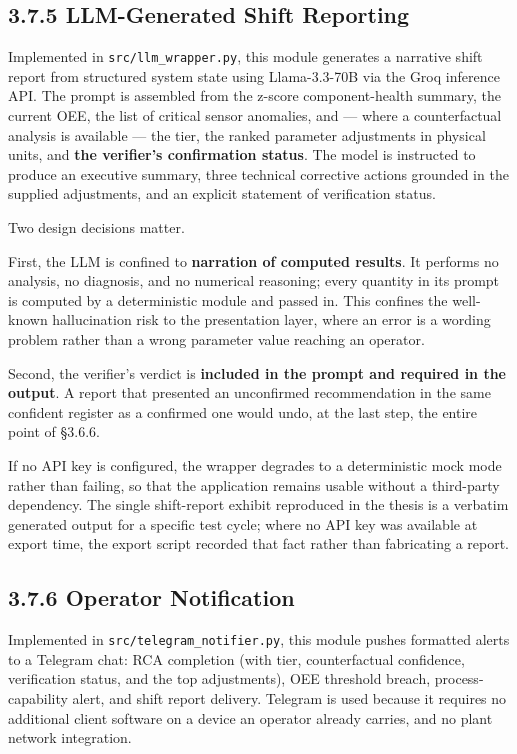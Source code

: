 \hypertarget{llm-generated-shift-reporting}{%
\subsection{3.7.5 LLM-Generated Shift Reporting}\label{llm-generated-shift-reporting}}

Implemented in \texttt{src/llm\_wrapper.py}, this module generates a narrative shift report from structured system state using Llama-3.3-70B via the Groq inference API. The prompt is assembled from the z-score component-health summary, the current OEE, the list of critical sensor anomalies, and --- where a counterfactual analysis is available --- the tier, the ranked parameter adjustments in physical units, and \textbf{the verifier's confirmation status}. The model is instructed to produce an executive summary, three technical corrective actions grounded in the supplied adjustments, and an explicit statement of verification status.

Two design decisions matter.

First, the LLM is confined to \textbf{narration of computed results}. It performs no analysis, no diagnosis, and no numerical reasoning; every quantity in its prompt is computed by a deterministic module and passed in. This confines the well-known hallucination risk to the presentation layer, where an error is a wording problem rather than a wrong parameter value reaching an operator.

Second, the verifier's verdict is \textbf{included in the prompt and required in the output}. A report that presented an unconfirmed recommendation in the same confident register as a confirmed one would undo, at the last step, the entire point of §3.6.6.

If no API key is configured, the wrapper degrades to a deterministic mock mode rather than failing, so that the application remains usable without a third-party dependency. The single shift-report exhibit reproduced in the thesis is a verbatim generated output for a specific test cycle; where no API key was available at export time, the export script recorded that fact rather than fabricating a report.

\hypertarget{operator-notification}{%
\subsection{3.7.6 Operator Notification}\label{operator-notification}}

Implemented in \texttt{src/telegram\_notifier.py}, this module pushes formatted alerts to a Telegram chat: RCA completion (with tier, counterfactual confidence, verification status, and the top adjustments), OEE threshold breach, process-capability alert, and shift report delivery. Telegram is used because it requires no additional client software on a device an operator already carries, and no plant network integration.

